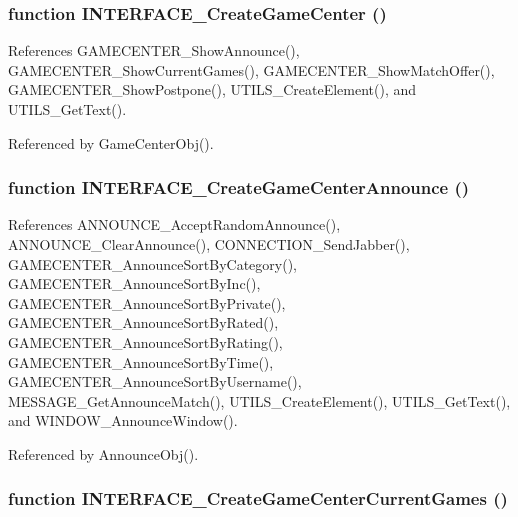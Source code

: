 \subsubsection[INTERFACE\_\-CreateGameCenter]{\setlength{\rightskip}{0pt plus 5cm}function INTERFACE\_\-CreateGameCenter ()}\label{interface_2gamecenter_8js_f721e204da9747dcc4fda5a25c841705}




References GAMECENTER\_\-ShowAnnounce(), GAMECENTER\_\-ShowCurrentGames(), GAMECENTER\_\-ShowMatchOffer(), GAMECENTER\_\-ShowPostpone(), UTILS\_\-CreateElement(), and UTILS\_\-GetText().

Referenced by GameCenterObj().
\subsubsection[INTERFACE\_\-CreateGameCenterAnnounce]{\setlength{\rightskip}{0pt plus 5cm}function INTERFACE\_\-CreateGameCenterAnnounce ()}\label{interface_2gamecenter_8js_f49ab210046037712ea0b89b243c7791}




References ANNOUNCE\_\-AcceptRandomAnnounce(), ANNOUNCE\_\-ClearAnnounce(), CONNECTION\_\-SendJabber(), GAMECENTER\_\-AnnounceSortByCategory(), GAMECENTER\_\-AnnounceSortByInc(), GAMECENTER\_\-AnnounceSortByPrivate(), GAMECENTER\_\-AnnounceSortByRated(), GAMECENTER\_\-AnnounceSortByRating(), GAMECENTER\_\-AnnounceSortByTime(), GAMECENTER\_\-AnnounceSortByUsername(), MESSAGE\_\-GetAnnounceMatch(), UTILS\_\-CreateElement(), UTILS\_\-GetText(), and WINDOW\_\-AnnounceWindow().

Referenced by AnnounceObj().
\subsubsection[INTERFACE\_\-CreateGameCenterCurrentGames]{\setlength{\rightskip}{0pt plus 5cm}function INTERFACE\_\-CreateGameCenterCurrentGames ()}\label{interface_2gamecenter_8js_8a57c9d92b6341c7c0d8ca40ebdaca81}




